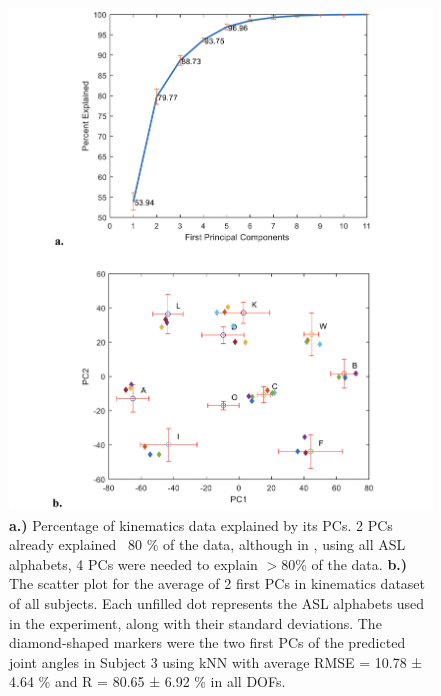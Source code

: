 \documentclass[conference]{IEEEtran}
\begin{document}
\begin{figure}
    \centering
    \includegraphics[width=\columnwidth]{figure5.png}
    \caption{\textbf{a.)} Percentage of kinematics data explained by its PCs. 2 PCs already explained ~80 \% of 
the data, although in \cite{b28}, using all ASL alphabets, 4 PCs were needed to explain $>$80\% of the data. 
\textbf{b.)} The scatter plot for the average of 2 first PCs in kinematics dataset of all subjects. Each unfilled 
dot represents the ASL alphabets used in the experiment, along with their standard deviations. The 
diamond-shaped markers were the two first PCs of the predicted joint angles in Subject 3 using kNN 
with average RMSE = 10.78 ± 4.64 \% and R = 80.65 ± 6.92 \% in all DOFs.}
    \label{figure5}
\end{figure}
\end{document}
